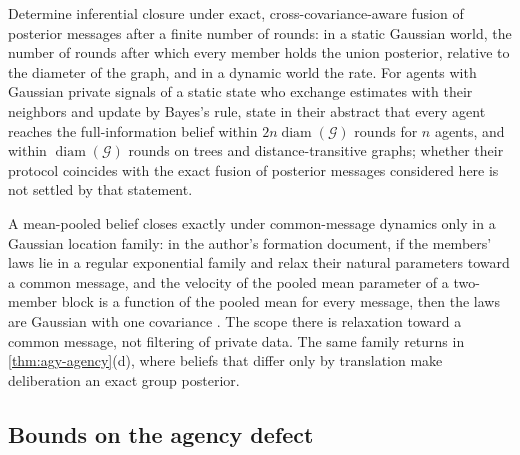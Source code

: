 \begin{openproblem}\label{open:agy-exact-fusion-consensus}
Determine inferential closure under exact, cross-covariance-aware fusion of posterior messages after a finite number of rounds: in a static Gaussian world, the number of rounds after which every member holds the union posterior, relative to the diameter of the graph, and in a dynamic world the rate. For agents with Gaussian private signals of a static state who exchange estimates with their neighbors and update by Bayes's rule, \citet{mossel2016efficient} state in their abstract that every agent reaches the full-information belief within $2n\operatorname{diam}(\mathcal G)$ rounds for $n$ agents, and within $\operatorname{diam}(\mathcal G)$ rounds on trees and distance-transitive graphs; whether their protocol coincides with the exact fusion of posterior messages considered here is not settled by that statement.
\end{openproblem}

\begin{remark}\label{rem:agy-location-family}
A mean-pooled belief closes exactly under common-message dynamics only in a Gaussian location family: in the author's formation document, if the members' laws lie in a regular exponential family and relax their natural parameters toward a common message, and the velocity of the pooled mean parameter of a two-member block is a function of the pooled mean for every message, then the laws are Gaussian with one covariance \citep{dennis2026formation}. The scope there is relaxation toward a common message, not filtering of private data. The same family returns in \cref{thm:agy-agency}(d), where beliefs that differ only by translation make deliberation an exact group posterior.
\end{remark}

\subsection{Bounds on the agency defect}\label{sup:agy-bounds-on-the-agency-defect}

